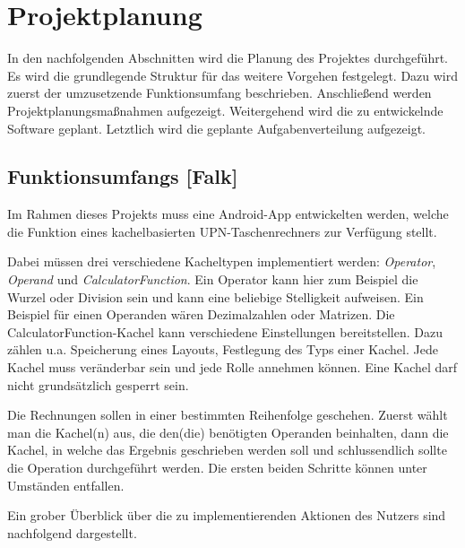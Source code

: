 \section{Projektplanung}

In den nachfolgenden Abschnitten wird die Planung des Projektes durchgeführt. Es wird die grundlegende Struktur für das weitere Vorgehen festgelegt. Dazu wird zuerst der umzusetzende Funktionsumfang beschrieben. Anschließend werden Projektplanungsmaßnahmen aufgezeigt. Weitergehend wird die zu entwickelnde Software geplant. Letztlich wird die geplante Aufgabenverteilung aufgezeigt.

\subsection{Funktionsumfangs [Falk]}

Im Rahmen dieses Projekts muss eine Android-App entwickelten werden, welche die Funktion eines kachelbasierten UPN-Taschenrechners zur Verfügung stellt. 

Dabei müssen drei verschiedene Kacheltypen implementiert werden: \textit{Operator}, \textit{Operand} und \textit{CalculatorFunction}. Ein Operator kann hier zum Beispiel die Wurzel oder Division sein und kann eine beliebige Stelligkeit aufweisen. Ein Beispiel für einen Operanden wären Dezimalzahlen oder Matrizen. Die CalculatorFunction-Kachel kann verschiedene Einstellungen bereitstellen. Dazu zählen u.a. Speicherung eines Layouts, Festlegung des Typs einer Kachel. Jede Kachel muss veränderbar sein und jede Rolle annehmen können. Eine Kachel darf nicht grundsätzlich gesperrt sein. 

Die Rechnungen sollen in einer bestimmten Reihenfolge geschehen. Zuerst wählt man die Kachel(n) aus, die den(die) benötigten Operanden beinhalten, dann die Kachel, in welche das Ergebnis geschrieben werden soll und schlussendlich sollte die Operation durchgeführt werden. Die ersten beiden Schritte können unter Umständen entfallen. 

Ein grober Überblick über die zu implementierenden Aktionen des Nutzers sind  nachfolgend dargestellt.

